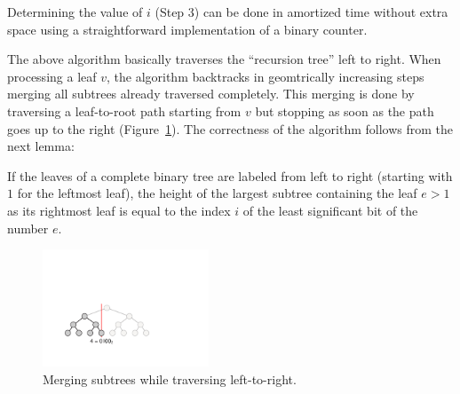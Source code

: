 Determining the value of $i$ (Step 3) can be done in  amortized
time without extra space using a straightforward implementation of a
binary counter.

The above algorithm basically traverses the ``recursion tree'' left to
right. When processing a leaf $v$, the algorithm backtracks in
geomtrically increasing steps merging all subtrees already traversed
completely. This merging is done by traversing a leaf-to-root path
starting from $v$ but stopping as soon as the path goes up to the
right (Figure~\ref{fig:tree_spaceefficient}). The correctness of the
algorithm follows from the next lemma:

\begin{lemma}
  If the leaves of a complete binary tree are labeled from left to
  right (starting with $1$ for the leftmost leaf), the height of the
  largest subtree containing the leaf $e>1$ as its rightmost leaf is
  equal to the index $i$ of the least significant bit of the number
  $e$.
\end{lemma}

\begin{figure}
  \centerline{\includegraphics[height=3.5cm]{tree_spaceefficient}}
  \caption{Merging subtrees while traversing left-to-right.}
  \label{fig:tree_spaceefficient}
\end{figure}

